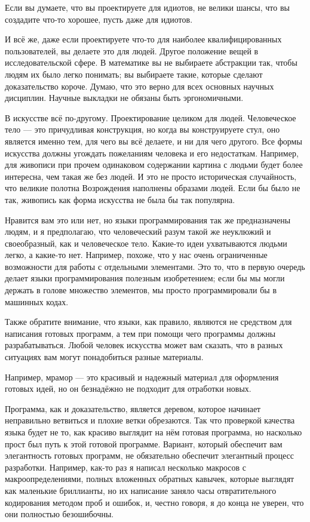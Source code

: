 \documentclass[ebook,12pt,oneside,openany]{memoir}
\begin{document}
Если вы думаете, что вы проектируете для идиотов, не велики шансы, что
вы создадите что-то хорошее, пусть даже для идиотов.

И всё же, даже если проектируете что-то для наиболее квалифицированных
пользователей, вы делаете это для людей. Другое положение вещей в
исследовательской сфере. В математике вы не выбираете абстракции так,
чтобы людям их было легко понимать; вы выбираете такие, которые
сделают доказательство короче. Думаю, что это верно для всех основных
научных дисциплин. Научные выкладки не обязаны быть эргономичными.

В искусстве всё по-другому. Проектирование целиком для людей.
Человеческое тело — это причудливая конструкция, но когда вы
конструируете стул, оно является именно тем, для чего вы всё делаете,
и ни для чего другого. Все формы искусства должны угождать пожеланиям
человека и его недостаткам. Например, для живописи при прочем
одинаковом содержании картина с людьми будет более интересна, чем
такая же без людей. И это не просто историческая случайность, что
великие полотна Возрождения наполнены образами людей. Если бы было не
так, живопись как форма искусства не была бы так популярна.

Нравится вам это или нет, но языки программирования так же
предназначены людям, и я предполагаю, что человеческий разум такой же
неуклюжий и своеобразный, как и человеческое тело. Какие-то идеи
ухватываются людьми легко, а какие-то нет. Например, похоже, что у нас
очень ограниченные возможности для работы с отдельными элементами. Это
то, что в первую очередь делает языки программирования полезным
изобретением; если бы мы могли держать в голове множество элементов,
мы просто программировали бы в машинных кодах.

Также обратите внимание, что языки, как правило, являются не средством
для написания готовых программ, а тем при помощи чего программы должны
разрабатываться. Любой человек искусства может вам сказать, что в
разных ситуациях вам могут понадобиться разные материалы.

Например, мрамор — это красивый и надежный материал для оформления
готовых идей, но он безнадёжно не подходит для отработки новых.

Программа, как и доказательство, является деревом, которое начинает
неправильно ветвиться и плохие ветки обрезаются. Так что проверкой
качества языка будет не то, как красиво выглядит на нём готовая
программа, но насколько прост был путь к этой готовой программе.
Вариант, который обеспечит вам элегантность готовых программ, не
обязательно обеспечит элегантный процесс разработки. Например, как-то
раз я написал несколько макросов с макроопределениями, полных
вложенных обратных кавычек, которые выглядят как маленькие бриллианты,
но их написание заняло часы отвратительного кодирования методом проб и
ошибок, и, честно говоря, я до конца не уверен, что они полностью
безошибочны.
\end{document}
